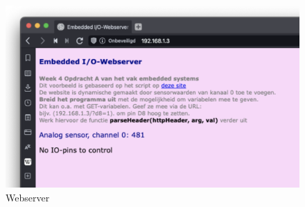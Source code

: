 \begin{figure}[h!]
\centering\includegraphics[scale=0.25]{Pictures/chapter01/webserver.png}
\caption{Webserver}
\label{fig:webserver} %
\end{figure}

